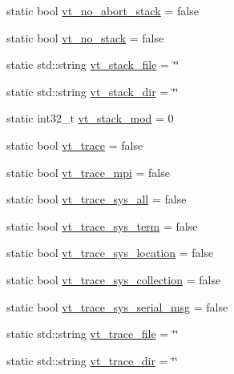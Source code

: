 \begin{DoxyCompactItemize}
static bool \hyperlink{structvt_1_1arguments_1_1_arg_config_a97f4bbea1134d1760b9a9858f7218852}{vt\+\_\+no\+\_\+abort\+\_\+stack} = false
\item 
static bool \hyperlink{structvt_1_1arguments_1_1_arg_config_a4aeb67323853bbd3d2d6092931895f0f}{vt\+\_\+no\+\_\+stack} = false
\item 
static std\+::string \hyperlink{structvt_1_1arguments_1_1_arg_config_a2fadbf7acefac8e3c5b4859f69956df4}{vt\+\_\+stack\+\_\+file} = \char`\"{}\char`\"{}
\item 
static std\+::string \hyperlink{structvt_1_1arguments_1_1_arg_config_a98165ce3647429d761c15c4b7e02226b}{vt\+\_\+stack\+\_\+dir} = \char`\"{}\char`\"{}
\item 
static int32\+\_\+t \hyperlink{structvt_1_1arguments_1_1_arg_config_a5f21f67c8c70d8c0f87f71c62ad3d206}{vt\+\_\+stack\+\_\+mod} = 0
\item 
static bool \hyperlink{structvt_1_1arguments_1_1_arg_config_a61bc1a82c8b643dc430d07f4da316f50}{vt\+\_\+trace} = false
\item 
static bool \hyperlink{structvt_1_1arguments_1_1_arg_config_a50f49d87bb92a729b22102b4da66030a}{vt\+\_\+trace\+\_\+mpi} = false
\item 
static bool \hyperlink{structvt_1_1arguments_1_1_arg_config_a0f29a730468e776a3281e5cb2694395c}{vt\+\_\+trace\+\_\+sys\+\_\+all} = false
\item 
static bool \hyperlink{structvt_1_1arguments_1_1_arg_config_a3618f4c676020355d57dd29623959224}{vt\+\_\+trace\+\_\+sys\+\_\+term} = false
\item 
static bool \hyperlink{structvt_1_1arguments_1_1_arg_config_ad810a33c24ce08006af0bafeffce9ec8}{vt\+\_\+trace\+\_\+sys\+\_\+location} = false
\item 
static bool \hyperlink{structvt_1_1arguments_1_1_arg_config_ac4afb6f023f686f3ed1643394d3ea80c}{vt\+\_\+trace\+\_\+sys\+\_\+collection} = false
\item 
static bool \hyperlink{structvt_1_1arguments_1_1_arg_config_a44627a2ab6723ed7646511a12124325e}{vt\+\_\+trace\+\_\+sys\+\_\+serial\+\_\+msg} = false
\item 
static std\+::string \hyperlink{structvt_1_1arguments_1_1_arg_config_a296fe4ab5d11f984532b780ffcf74657}{vt\+\_\+trace\+\_\+file} = \char`\"{}\char`\"{}
\item 
static std\+::string \hyperlink{structvt_1_1arguments_1_1_arg_config_aa30e39d83c2391ff918f86f8d5009b3f}{vt\+\_\+trace\+\_\+dir} = \char`\"{}\char`\"{}
\item 

\end{DoxyCompactItemize}
